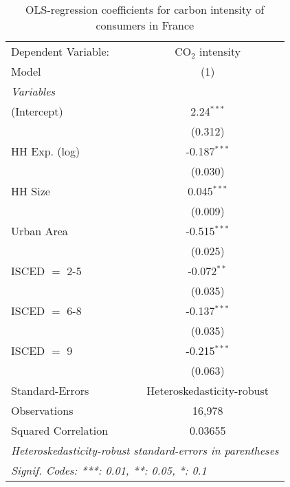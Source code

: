
\begin{table}[htbp!]
   \centering
   \small
   \begin{adjustbox}{width = 1\textwidth, max height = 0.95\textheight, center}
      \begin{threeparttable}[b]
         \caption{\label{tab:OLS_1_FRA} OLS-regression coefficients for carbon intensity of consumers in France}
         \begin{tabular}{lc}
            \tabularnewline \midrule \midrule
            Dependent Variable: & CO$_{2}$ intensity\\  
            Model               & (1)\\  
            \midrule
            \emph{Variables}\\
            (Intercept)         & 2.24$^{***}$\\   
                                & (0.312)\\   
            HH Exp. (log)       & -0.187$^{***}$\\   
                                & (0.030)\\   
            HH Size             & 0.045$^{***}$\\   
                                & (0.009)\\   
            Urban Area          & -0.515$^{***}$\\   
                                & (0.025)\\   
            ISCED $=$ 2-5       & -0.072$^{**}$\\   
                                & (0.035)\\   
            ISCED $=$ 6-8       & -0.137$^{***}$\\   
                                & (0.035)\\   
            ISCED $=$ 9         & -0.215$^{***}$\\   
                                & (0.063)\\   
            \midrule 
            Standard-Errors     & Heteroskedasticity-robust \\   
            Observations        & 16,978\\  
            Squared Correlation & 0.03655\\  
            \midrule \midrule
            \multicolumn{2}{l}{\emph{Heteroskedasticity-robust standard-errors in parentheses}}\\
            \multicolumn{2}{l}{\emph{Signif. Codes: ***: 0.01, **: 0.05, *: 0.1}}\\
         \end{tabular}
         

\end{threeparttable}
\end{adjustbox}
\end{table}
